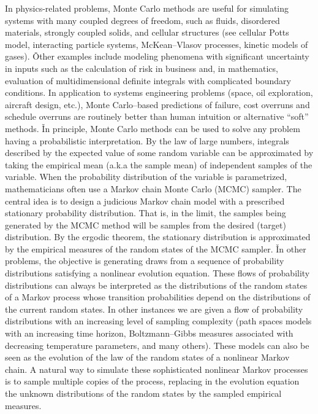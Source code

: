 In physics-related problems, Monte Carlo methods are useful for simulating systems with many coupled degrees of
freedom, such as fluids, disordered materials, strongly coupled solids, and cellular structures (see cellular Potts
model, interacting particle systems, McKean–Vlasov processes, kinetic models of gases). \v

Other examples include modeling phenomena with significant uncertainty in inputs such as the calculation of risk in
business and, in mathematics, evaluation of multidimensional definite integrals with complicated boundary conditions.
In application to systems engineering problems (space, oil exploration, aircraft design, etc.), Monte Carlo–based
predictions of failure, cost overruns and schedule overruns are routinely better than human intuition or alternative
``soft'' methods. \v

In principle, Monte Carlo methods can be used to solve any problem having a probabilistic interpretation. By the law
of large numbers, integrals described by the expected value of some random variable can be approximated by taking the
empirical mean (a.k.a the sample mean) of independent samples of the variable. When the probability distribution of
the variable is parametrized, mathematicians often use a Markov chain Monte Carlo (MCMC) sampler. The central idea is
to design a judicious Markov chain model with a prescribed stationary probability distribution. That is, in the
limit, the samples being generated by the MCMC method will be samples from the desired (target) distribution. By the
ergodic theorem, the stationary distribution is approximated by the empirical measures of the random states of the
MCMC sampler. \v

In other problems, the objective is generating draws from a sequence of probability distributions satisfying a
nonlinear evolution equation. These flows of probability distributions can always be interpreted as the distributions
of the random states of a Markov process whose transition probabilities depend on the distributions of the current
random states. In other instances we are given a flow of probability distributions with an increasing level of
sampling complexity (path spaces models with an increasing time horizon, Boltzmann–Gibbs measures associated with
decreasing temperature parameters, and many others). These models can also be seen as the evolution of the law of the
random states of a nonlinear Markov chain. A natural way to simulate these sophisticated nonlinear Markov processes
is to sample multiple copies of the process, replacing in the evolution equation the unknown distributions of the
random states by the sampled empirical measures.

